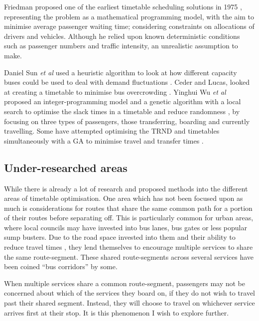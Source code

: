 \documentclass{article}
\begin{document}
\par 
Friedman proposed one of the earliest timetable scheduling solutions in 1975\cite{RN22} , representing the problem as a mathematical programming model, with the aim to minimise average passenger waiting time; considering constraints on allocations of drivers and vehicles. Although he relied upon known deterministic conditions such as passenger numbers and traffic intensity, an unrealistic assumption to make.

\par 
Daniel Sun \textsl{et al} used a heuristic algorithm to look at how different capacity buses could be used to deal with demand fluctuations  \cite{RN32}. Ceder and Lucas, looked at creating a timetable to minimise bus overcrowding \cite{RN33}. Yinghui Wu \textsl{et al} proposed an integer-programming model and a genetic algorithm with a local search to optimise the slack times in a timetable and reduce randomness \cite{RN26}, by focusing on three types of passengers, those transferring, boarding and currently travelling. Some have attempted optimising the TRND and timetables simultaneously with a GA to minimise travel and transfer times \cite{RN23}\cite{RN31}. 
 

 
\subsection{Under-researched areas}
 
While there is already a lot of research and proposed methods into the different areas of timetable optimisation. One area which has not been focused upon as much is considerations for routes that share the same common path for a portion of their routes before separating off. This is particularly common for urban areas, where local councils may have invested into bus lanes, bus gates or less popular sump busters. Due to the road space invested into them and their ability to reduce travel times \cite{RN34}, they lend themselves to encourage multiple services to share the same route-segment. These shared route-segments across several services have been coined ``bus corridors'' by some.

\par
When multiple services share a common route-segment, passengers may not be concerned about which of the services they board on, if they do not wish to travel past their shared segment. Instead, they will choose to travel on whichever service arrives first at their stop. It is this phenomenon I wish to explore further.
\end{document}
